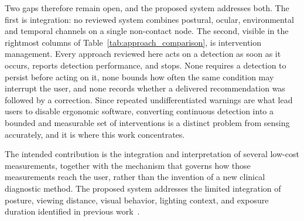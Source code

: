 Two gaps therefore remain open, and the proposed system addresses both. The first is integration: no reviewed system combines postural, ocular, environmental and temporal channels on a single non-contact node. The second, visible in the rightmost columns of Table~\ref{tab:approach_comparison}, is intervention management. Every approach reviewed here acts on a detection as soon as it occurs, reports detection performance, and stops. None requires a detection to persist before acting on it, none bounds how often the same condition may interrupt the user, and none records whether a delivered recommendation was followed by a correction. Since repeated undifferentiated warnings are what lead users to disable ergonomic software, converting continuous detection into a bounded and measurable set of interventions is a distinct problem from sensing accurately, and it is where this work concentrates.

The intended contribution is the integration and interpretation of several low-cost measurements, together with the mechanism that governs how those measurements reach the user, rather than the invention of a new clinical diagnostic method. The proposed system addresses the limited integration of posture, viewing distance, visual behavior, lighting context, and exposure duration identified in previous work~\cite{ref4,ref5,ref6,ref7,ref8,ref9,ref10,ref12,ref14,ref15,ref16,ref17,ref19,ref20,ref21,ref22,ref23,ref24,ref25}.


